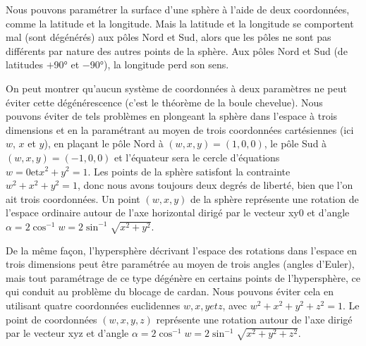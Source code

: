 Nous pouvons paramétrer la surface d'une sphère à l'aide de deux coordonnées, comme la latitude et la longitude. Mais la latitude et la longitude se comportent mal (sont dégénérés) aux pôles Nord et Sud, alors que les pôles ne sont pas différents par nature des autres points de la sphère. Aux pôles Nord et Sud (de latitudes $+$\ang{90} et $-$\ang{90}), la longitude perd son sens.

On peut montrer qu'aucun système de coordonnées à deux paramètres ne peut éviter cette dégénérescence (c'est le théorème de la boule chevelue). Nous pouvons éviter de tels problèmes en plongeant la sphère dans l'espace à trois dimensions et en la paramétrant au moyen de trois coordonnées cartésiennes (ici $w$, $x$ et $y$), en plaçant le pôle Nord à $(w, x, y) = (1, 0, 0)$, le pôle Sud à $(w, x, y) = ( -1, 0, 0)$ et l'équateur sera le cercle d'équations $w = 0 \text{et} x^2 + y^2 = 1$. Les points de la sphère satisfont la contrainte $w^2 + x^2 + y^2 = 1$, donc nous avons toujours deux degrés de liberté, bien que l'on ait trois coordonnées. Un point $(w, x, y)$ de la sphère représente une rotation de l'espace ordinaire autour de l'axe horizontal dirigé par le vecteur  {x}{y}{0}
et d'angle $\alpha = 2\cos^{-1} w = 2 \sin^{-1}\sqrt{x^2+y^2}$.

De la même façon, l'hypersphère décrivant l'espace des rotations dans l'espace en trois dimensions peut être paramétrée au moyen de trois angles (angles d'Euler), mais tout paramétrage de ce type dégénère en certains points de l'hypersphère, ce qui conduit au problème du blocage de cardan. Nous pouvons éviter cela en utilisant quatre coordonnées euclidennes $w, x, y et z$, avec $w^2 + x^2 + y^2 + z^2 = 1$. Le point de coordonnées $(w, x, y, z)$ représente une rotation autour de l'axe dirigé par le vecteur  {x}{y}{z}
et d'angle $\alpha = 2\cos^{-1} w = 2 \sin^{-1}\sqrt{x^2+y^2+z^2}$.